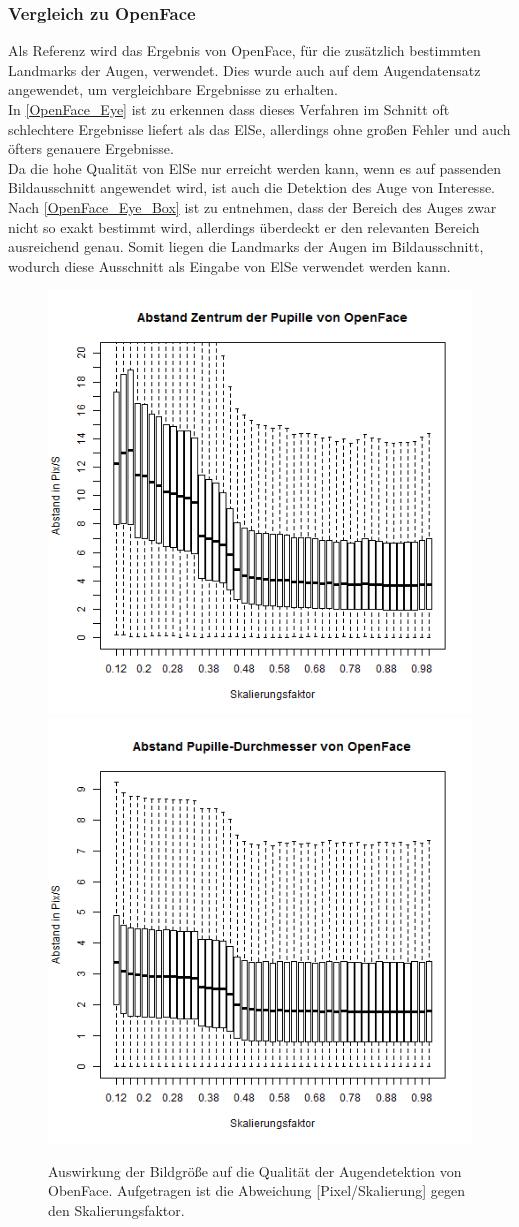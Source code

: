 \subsubsection{Vergleich zu OpenFace}
Als Referenz wird das Ergebnis von OpenFace, für die zusätzlich bestimmten Landmarks der Augen, verwendet. Dies wurde auch auf dem Augendatensatz \cite{database_Eye} angewendet, um vergleichbare Ergebnisse zu erhalten.\\
In \autoref{OpenFace_Eye} ist zu erkennen dass dieses Verfahren im Schnitt oft schlechtere Ergebnisse liefert als das ElSe, allerdings ohne großen Fehler und auch öfters genauere Ergebnisse.\\
Da die hohe Qualität von ElSe nur erreicht werden kann, wenn es auf passenden Bildausschnitt angewendet wird, ist auch die Detektion des Auge von Interesse.\\
Nach \autoref{OpenFace_Eye_Box} ist zu entnehmen, dass der Bereich des Auges zwar nicht so exakt bestimmt wird, allerdings überdeckt er den relevanten Bereich ausreichend genau. Somit liegen die Landmarks der Augen im Bildausschnitt, wodurch diese Ausschnitt als Eingabe von ElSe verwendet werden kann.
\begin{figure}
	\centering
	\includegraphics[width=0.45\linewidth]{Eye_Img_Box/Openface_PC}
	\includegraphics[width=0.45\linewidth]{Eye_Img_Box/Openface_PW}
	\caption{Auswirkung der Bildgröße auf die Qualität der Augendetektion von ObenFace. Aufgetragen ist die Abweichung [Pixel/Skalierung] gegen den Skalierungsfaktor.}
	\label{OpenFace_Eye}
\end{figure}
